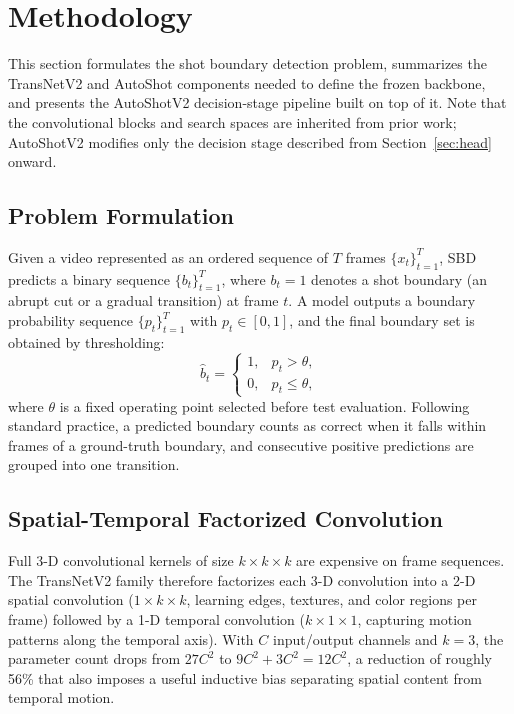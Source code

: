 \section{Methodology}
\label{sec:method}

This section formulates the shot boundary detection problem, summarizes the
TransNetV2 and AutoShot components needed to define the frozen backbone, and
presents the AutoShotV2 decision-stage pipeline built on top of it. Note that
the convolutional blocks and search spaces are inherited from prior work;
AutoShotV2 modifies only the decision stage described from Section~\ref{sec:head} onward.

\subsection{Problem Formulation}
\label{sec:problem}

Given a video represented as an ordered sequence of $T$ frames
$\{x_t\}_{t=1}^{T}$, SBD predicts a binary sequence $\{b_t\}_{t=1}^{T}$,
where $b_t{=}1$ denotes a shot boundary (an abrupt cut or a gradual
transition) at frame $t$. A model outputs a boundary probability sequence
$\{p_t\}_{t=1}^{T}$ with $p_t\in[0,1]$, and the final boundary set is
obtained by thresholding:
\begin{equation}
    \hat b_t=\begin{cases}1, & p_t > \theta,\\ 0, & p_t \le \theta,\end{cases}
    \label{eq:threshold}
\end{equation}
where $\theta$ is a fixed operating point selected before test evaluation. Following standard practice,
a predicted boundary counts as correct when it falls within
\PaperMatchTolerance{} frames of a ground-truth boundary, and consecutive
positive predictions are grouped into one transition.

\subsection{Spatial-Temporal Factorized Convolution}

Full 3-D convolutional kernels of size $k\times k\times k$ are expensive on
frame sequences. The TransNetV2 family therefore factorizes
each 3-D convolution into a 2-D spatial convolution ($1\times k\times k$,
learning edges, textures, and color regions per frame) followed by a 1-D
temporal convolution ($k\times 1\times 1$, capturing motion patterns along
the temporal axis). With $C$ input/output channels and $k{=}3$, the
parameter count drops from $27C^2$ to $9C^2+3C^2=12C^2$, a reduction of
roughly 56\% that also imposes a useful inductive bias separating spatial
content from temporal motion.

